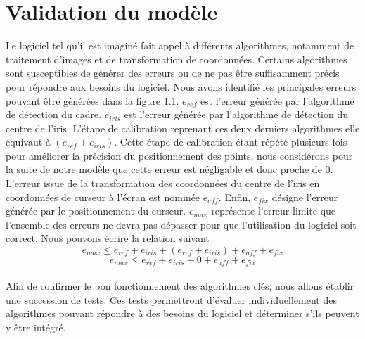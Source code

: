 \documentclass[a4paper, 12pt]{report}
\begin{document}
    \chapter{Validation du modèle}
    	Le logiciel tel qu'il est imaginé fait appel à différents algorithmes, notamment de traitement d'images et de transformation de coordonnées. Certains algorithmes sont susceptibles de générer des erreurs ou de ne pas être suffisamment précis pour répondre aux besoins du logiciel. Nous avons identifié les principales erreurs pouvant être générées dans la figure 1.1. $e_{ref}$ est l'erreur générée par l'algorithme de détection du cadre. $e_{iris}$ est l'erreur générée par l'algorithme de détection du centre de l'iris. L'étape de calibration reprenant ces deux derniers algorithmes elle équivaut à $(e_{ref} + e_{iris})$. Cette étape de calibration étant répété plusieurs fois pour améliorer la précision du positionnement des points, nous considérons pour la suite de notre modèle que cette erreur est négligable et donc proche de 0. L'erreur issue de la transformation des coordonnées du centre de l'iris en coordonnées de curseur à l'écran est nommée $e_{aff}$. Enfin, $e_{fix}$ désigne l'erreur générée par le positionnement du curseur. $e_{max}$ représente l'erreur limite que l'ensemble des erreurs ne devra pas dépasser pour que l'utilisation du logiciel soit correct. Nous pouvons écrire la relation suivant :
    	$$
    	e_{max} \le e_{ref} + e_{iris} + (e_{ref} + e_{iris}) + e_{aff} + e_{fix}
    	$$
    	$$
    	e_{max} \le e_{ref} + e_{iris} + 0 + e_{aff} + e_{fix}
    	$$
    	\\
    	Afin de confirmer le bon fonctionnement des algorithmes clés, nous allons établir une succession de tests. Ces tests permettront d'évaluer individuellement des  algorithmes pouvant répondre à des besoins du logiciel et déterminer s'ils peuvent y être intégré.
\end{document}
